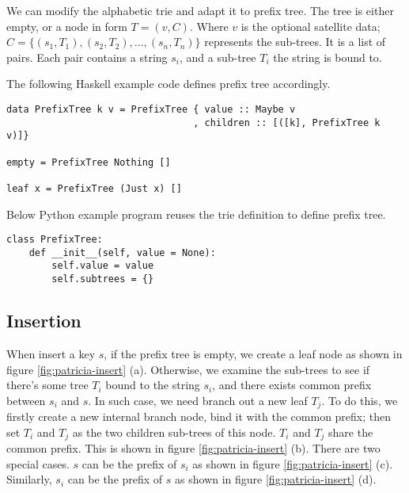 \documentclass[b5paper]{article}
\begin{document}
We can modify the alphabetic trie and adapt it
to prefix tree. The tree is either empty, or a node in form $T = (v, C)$.
Where $v$ is the optional satellite data; $C = \{(s_1, T_1), (s_2, T_2), ..., (s_n, T_n)\}$ represents the sub-trees. It is a list of pairs. Each pair contains
a string $s_i$, and a sub-tree $T_i$ the string is bound to.

The following Haskell example code defines prefix tree accordingly.

\lstset{language=Haskell}
\begin{lstlisting}
data PrefixTree k v = PrefixTree { value :: Maybe v
                                 , children :: [([k], PrefixTree k v)]}

empty = PrefixTree Nothing []

leaf x = PrefixTree (Just x) []
\end{lstlisting}

Below Python example program reuses the trie definition to define prefix tree.

\lstset{language=Python}
\begin{lstlisting}
class PrefixTree:
    def __init__(self, value = None):
        self.value = value
        self.subtrees = {}
\end{lstlisting}

\subsection{Insertion}

When insert a key $s$, if the prefix tree is empty, we
create a leaf node as shown in figure \ref{fig:patricia-insert} (a).
Otherwise, we examine the sub-trees to see if
there's some tree $T_i$ bound to the string $s_i$,
and there exists common prefix between $s_i$ and $s$. In such case, we
need branch out a new leaf $T_j$. To do this, we firstly
create a new internal branch node, bind it with the common
prefix; then set $T_i$ and $T_j$ as the two children sub-trees of this node.
$T_i$ and $T_j$ share the common
prefix. This is shown in figure \ref{fig:patricia-insert} (b).
There are two special cases. $s$ can be the prefix of $s_i$
as shown in figure \ref{fig:patricia-insert} (c). Similarly,
$s_i$ can be the prefix of $s$ as shown in figure \ref{fig:patricia-insert} (d).
\end{document}
